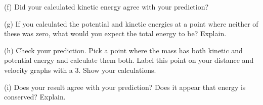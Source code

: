 (f) Did your calculated kinetic energy agree with your prediction?
\vspace{20mm}

(g) If you calculated the potential and kinetic energies at a point where neither
of these was zero, what would you expect the total energy to be? Explain.
\vspace{20mm}

(h) Check your prediction. Pick a point where the mass has both kinetic and
potential energy and calculate them both. Label this point on your distance
and velocity graphs with a 3. Show your calculations.
\vspace{40mm}

(i) Does your result agree with your prediction? Does it appear that energy
is conserved? Explain.

